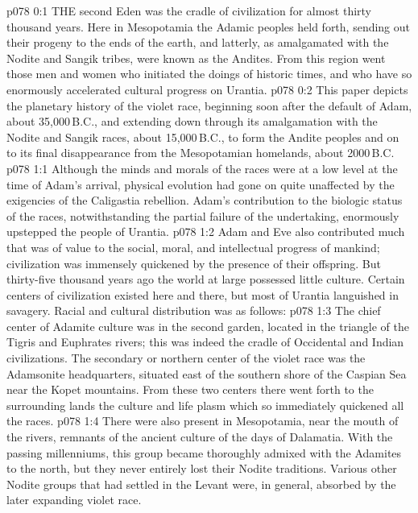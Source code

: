 \vs p078 0:1 THE second Eden was the cradle of civilization for almost thirty thousand years. Here in Mesopotamia the Adamic peoples held forth, sending out their progeny to the ends of the earth, and latterly, as amalgamated with the Nodite and Sangik tribes, were known as the Andites. From this region went those men and women who initiated the doings of historic times, and who have so enormously accelerated cultural progress on Urantia.
\vs p078 0:2 This paper depicts the planetary history of the violet race, beginning soon after the default of Adam, about 35,000\,B.C., and extending down through its amalgamation with the Nodite and Sangik races, about 15,000\,B.C., to form the Andite peoples and on to its final disappearance from the Mesopotamian homelands, about 2000\,B.C.
\vs p078 1:1 Although the minds and morals of the races were at a low level at the time of Adam’s arrival, physical evolution had gone on quite unaffected by the exigencies of the Caligastia rebellion. Adam’s contribution to the biologic status of the races, notwithstanding the partial failure of the undertaking, enormously upstepped the people of Urantia.
\vs p078 1:2 Adam and Eve also contributed much that was of value to the social, moral, and intellectual progress of mankind; civilization was immensely quickened by the presence of their offspring. But thirty\hyp{}five thousand years ago the world at large possessed little culture. Certain centers of civilization existed here and there, but most of Urantia languished in savagery. Racial and cultural distribution was as follows:
\vs p078 1:3 \bibnobreakspace {} The chief center of Adamite culture was in the second garden, located in the triangle of the Tigris and Euphrates rivers; this was indeed the cradle of Occidental and Indian civilizations. The secondary or northern center of the violet race was the Adamsonite headquarters, situated east of the southern shore of the Caspian Sea near the Kopet mountains. From these two centers there went forth to the surrounding lands the culture and life plasm which so immediately quickened all the races.
\vs p078 1:4 \pc {}\bibnobreakspace {} There were also present in Mesopotamia, near the mouth of the rivers, remnants of the ancient culture of the days of Dalamatia. With the passing millenniums, this group became thoroughly admixed with the Adamites to the north, but they never entirely lost their Nodite traditions. Various other Nodite groups that had settled in the Levant were, in general, absorbed by the later expanding violet race.
